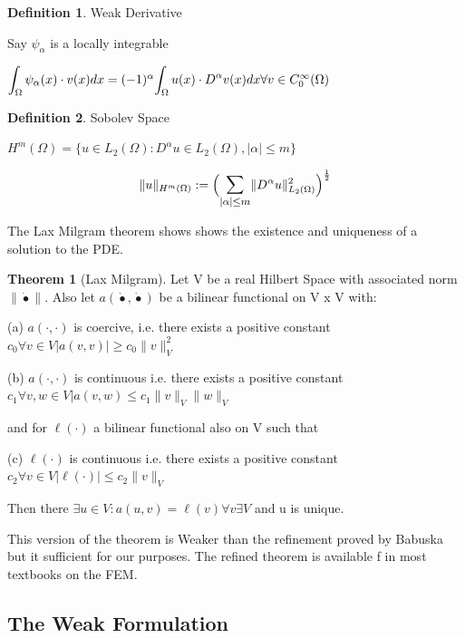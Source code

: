 \documentclass{uonmathreport}
\theoremstyle{definition}
\newtheorem{definition}{Definition}[section]
\theoremstyle{problem}
\theoremstyle{theorem}
\newtheorem{theorem}{Theorem}[section]
\begin{document}
\theoremstyle{definition}
\begin{definition}{Weak Derivative}

Say $\psi_\alpha$ is a locally integrable 

$\mathlarger{\int_\Omega  \psi_\alpha(x) \cdot v(x) dx} = (-1)^{\alpha} \mathlarger{\int_\Omega  u(x) \cdot D^{\alpha} v(x) dx} \forall v \in C^\infty_0(\Omega)$

\end{definition}

\theoremstyle{definition}
\begin{definition}{Sobolev Space}

$H^{m}(\Omega) = \{ u \in L_2(\Omega) : D^{\alpha} u \in L_2(\Omega), |\alpha| \leq m \}$

$$\|u\|_{H^m(\Omega)} :=  \Big(\mathlarger{\sum_{|\alpha|\leq m}}\|D^{\alpha}u\|^2_{L_2(\Omega)} \Big)^{\frac{1}{2}} $$


\end{definition}

The Lax Milgram theorem shows shows the existence and uniqueness of a solution to the PDE. 


\begin{theorem}[Lax Milgram]
\label{Lax Milgram}
Let V be a real Hilbert Space with associated norm $\|\dot{•}\|$. Also let $a(\dot{•}, \dot{•})$ be a bilinear functional on V x V with:

(a) $a(\cdot, \cdot)$ is coercive, i.e. there exists a positive constant $c_0 \forall v \in V |a(v, v)|  \geq c_0 \|v\|^2_V$ 

(b) $a(\cdot, \cdot)$ is continuous i.e. there exists a positive constant $c_1 \forall v, w \in V |a(v, w) \leq c_1 \|v\|_V \|w\|_V$ 

and for $\ell(\cdot)$ a bilinear functional also on V such that 

(c) $\ell(\cdot)$ is continuous i.e. there exists a positive constant $c_2 \forall v \in V |\ell(\cdot)|  \leq c_2 \|v\|_V$

Then there $\exists u \in V: a(u, v) = \ell(v) \forall v \exists V$ and u is unique.
\end{theorem}

This version of the theorem is Weaker than the refinement proved by Babuska but it sufficient for our purposes. The refined theorem is available f in most textbooks on the FEM.




\clearpage


\subsection{The Weak Formulation} \label{subsec:Weak Formulation}
\end{document}
